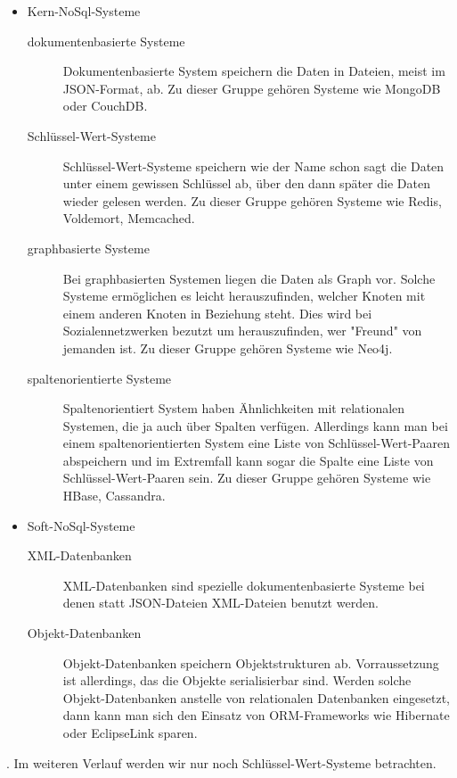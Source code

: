 \begin{itemize}
\item Kern-NoSql-Systeme
\begin{description}
\item[dokumentenbasierte Systeme] Dokumentenbasierte System speichern die Daten
in Dateien, meist im \gls{JSON}-Format, ab. Zu dieser Gruppe gehören Systeme wie
MongoDB oder CouchDB.
\item[Schlüssel-Wert-Systeme] Schlüssel-Wert-Systeme speichern wie der Name schon
sagt die Daten unter einem gewissen Schlüssel ab, über den dann später die Daten
wieder gelesen werden. Zu dieser Gruppe gehören Systeme wie Redis, Voldemort,
Memcached.
\item[graphbasierte Systeme] Bei graphbasierten Systemen liegen die Daten als
Graph vor. Solche Systeme ermöglichen es leicht herauszufinden, welcher Knoten
mit einem anderen Knoten in Beziehung steht. Dies wird bei Sozialennetzwerken
bezutzt um herauszufinden, wer "Freund" von jemanden ist. Zu dieser Gruppe
gehören Systeme wie Neo4j.
\item[spaltenorientierte Systeme] Spaltenorientiert System haben Ähnlichkeiten
mit relationalen Systemen, die ja auch über Spalten verfügen. Allerdings kann man
bei einem spaltenorientierten System eine Liste von Schlüssel-Wert-Paaren
abspeichern und im Extremfall kann sogar die Spalte eine Liste von
Schlüssel-Wert-Paaren sein. Zu dieser Gruppe gehören Systeme wie HBase, Cassandra.
\end{description}
\item Soft-NoSql-Systeme
\begin{description}
\item[XML-Datenbanken] XML-Datenbanken sind spezielle dokumentenbasierte Systeme
bei denen statt \gls{JSON}-Dateien XML-Dateien benutzt werden.
\item[Objekt-Datenbanken] Objekt-Datenbanken speichern Objektstrukturen ab.
Vorraussetzung ist allerdings, das die Objekte serialisierbar sind. Werden
solche Objekt-Datenbanken anstelle von relationalen Datenbanken eingesetzt, dann
kann man sich den Einsatz von \gls{ORM}-Frameworks wie Hibernate oder EclipseLink
sparen.
\end{description}
\end{itemize}

. Im weiteren Verlauf werden wir nur noch Schlüssel-Wert-Systeme betrachten.
